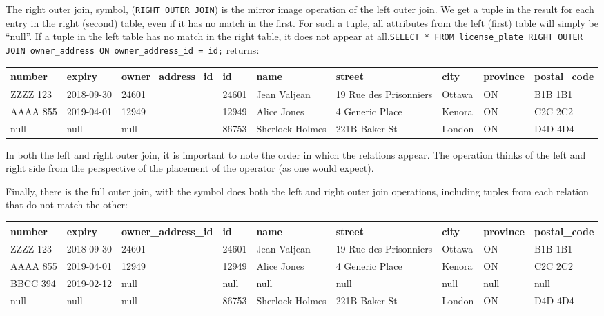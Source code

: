 The right outer join, symbol, {\tiny {}} (\texttt{RIGHT OUTER JOIN}) is the mirror image operation of the left outer join. We get a tuple in the result for each entry in the right (second) table, even if it has no match in the first. For such a tuple, all attributes from the left (first) table will simply be ``null''. If a tuple in the left table has no match in the right table, it does not appear at all.\texttt{SELECT * FROM license\_plate RIGHT OUTER JOIN owner\_address ON owner\_address\_id = id;} returns:

{\scriptsize
\begin{center}
	\begin{tabular}{|l|l|l|l|l|l|l|l|l|}\hline
		\textbf{number} & \textbf{expiry} & \textbf{owner\_address\_id} & \textbf{id} & \textbf{name} &\textbf{street} & \textbf{city} & \textbf{province} & \textbf{postal\_code} \\ \hline
		ZZZZ 123 & 2018-09-30 & 24601 & 24601 & Jean Valjean & 19 Rue des Prisonniers & Ottawa & ON & B1B 1B1\\ \hline
		AAAA 855 & 2019-04-01 & 12949 & 12949 & Alice Jones & 4 Generic Place & Kenora & ON & C2C 2C2\\ \hline
		null & null & null & 86753 & Sherlock Holmes & 221B Baker St & London & ON & D4D 4D4 \\ \hline
	\end{tabular}
\end{center}
}

In both the left and right outer join, it is important to note the order in which the relations appear. The operation thinks of the left and right side from the perspective of the placement of the operator (as one would expect).

Finally, there is the full outer join, with the symbol {\tiny {}} does both the left and right outer join operations, including tuples from each relation that do not match the other: 

{\scriptsize
\begin{center}
	\begin{tabular}{|l|l|l|l|l|l|l|l|l|}\hline
		\textbf{number} & \textbf{expiry} & \textbf{owner\_address\_id} & \textbf{id} & \textbf{name} &\textbf{street} & \textbf{city} & \textbf{province} & \textbf{postal\_code} \\ \hline
		ZZZZ 123 & 2018-09-30 & 24601 & 24601 & Jean Valjean & 19 Rue des Prisonniers & Ottawa & ON & B1B 1B1\\ \hline
		AAAA 855 & 2019-04-01 & 12949 & 12949 & Alice Jones & 4 Generic Place & Kenora & ON & C2C 2C2\\ \hline
		BBCC 394 & 2019-02-12 & null & null & null & null & null & null & null \\ \hline
		null & null & null & 86753 & Sherlock Holmes & 221B Baker St & London & ON & D4D 4D4 \\ \hline
	\end{tabular}
\end{center}
}

